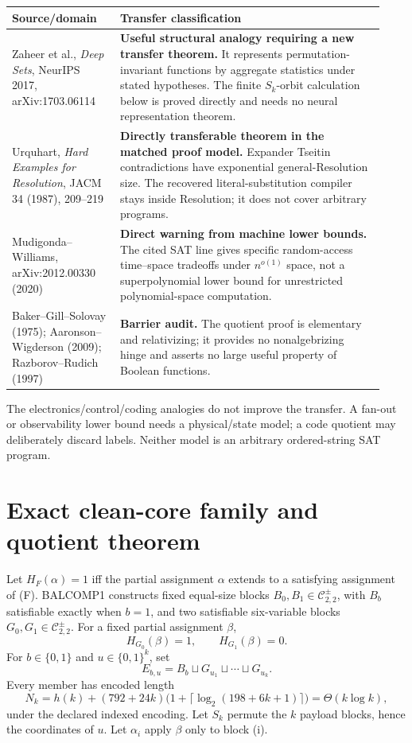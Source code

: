 \documentclass[11pt]{article}
\newcommand{\Core}{\mathcal C_{2,2}^{\pm}}
\begin{document}
\begin{center}\small
\begin{tabular}{p{0.27\linewidth}p{0.66\linewidth}}
\toprule
Source/domain & Transfer classification \\
\midrule
Zaheer et al., \emph{Deep Sets}, NeurIPS 2017, arXiv:1703.06114 &
\textbf{Useful structural analogy requiring a new transfer theorem.}  It
represents permutation-invariant functions by aggregate statistics under
stated hypotheses.  The finite \(S_k\)-orbit calculation below is proved
directly and needs no neural representation theorem. \\
Urquhart, \emph{Hard Examples for Resolution}, JACM 34 (1987), 209--219 &
\textbf{Directly transferable theorem in the matched proof model.}  Expander
Tseitin contradictions have exponential general-Resolution size.  The
recovered literal-substitution compiler stays inside Resolution; it does not
cover arbitrary programs. \\
Mudigonda--Williams, arXiv:2012.00330 (2020) &
\textbf{Direct warning from machine lower bounds.}  The cited SAT line gives
specific random-access time--space tradeoffs under \(n^{o(1)}\) space, not a
superpolynomial lower bound for unrestricted polynomial-space computation. \\
Baker--Gill--Solovay (1975); Aaronson--Wigderson (2009); Razborov--Rudich
(1997) & \textbf{Barrier audit.}  The quotient proof is elementary and
relativizing; it provides no nonalgebrizing hinge and asserts no large useful
property of Boolean functions. \\
\bottomrule
\end{tabular}
\end{center}

The electronics/control/coding analogies do not improve the transfer.  A
fan-out or observability lower bound needs a physical/state model; a code
quotient may deliberately discard labels.  Neither model is an arbitrary
ordered-string SAT program.

\section{Exact clean-core family and quotient theorem}
Let \(H_F(\alpha)=1\) iff the partial assignment \(\alpha\) extends to a
satisfying assignment of (F).  BALCOMP1 constructs fixed equal-size blocks
\(B_0,B_1\in\Core\), with \(B_b\) satisfiable exactly when \(b=1\), and two
satisfiable six-variable blocks \(G_0,G_1\in\Core\).  For a fixed partial
assignment \(\beta\),
\[
 H_{G_0}(\beta)=1,\qquad H_{G_1}(\beta)=0.
\]
For \(b\in\{0,1\}\) and \(u\in\{0,1\}^k\), set
\[
 E_{b,u}=B_b\sqcup G_{u_1}\sqcup\cdots\sqcup G_{u_k}.
\]
Every member has encoded length
\[
 N_k=h(k)+(792+24k)\bigl(1+\lceil\log_2(198+6k+1)\rceil\bigr)
     =\Theta(k\log k),                                      \tag{1}
\]
under the declared indexed encoding.  Let \(S_k\) permute the \(k\) payload
blocks, hence the coordinates of \(u\).  Let \(\alpha_i\) apply \(\beta\) only
to block (i).
\end{document}
